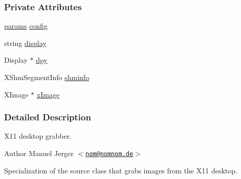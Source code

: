 \subsubsection*{\-Private \-Attributes}
\begin{DoxyCompactItemize}
\item 
\hyperlink{structX11Source_1_1params}{params} \hyperlink{classX11Source_a0bb66f8a67eaf9fd1a9c7cd457744e6a}{config}
\item 
string \hyperlink{classX11Source_aca767875225424e06a91240ce66878fd}{display}
\item 
\-Display $\ast$ \hyperlink{classX11Source_ab29ca4f07bd4d6e512d900268b9ae6e4}{dpy}
\item 
\-X\-Shm\-Segment\-Info \hyperlink{classX11Source_a77384d75a89d1fdd0cb3f20f61453f46}{shminfo}
\item 
\-X\-Image $\ast$ \hyperlink{classX11Source_a88bec28d12299ca93f4516a1e6ce7cff}{x\-Image}
\end{DoxyCompactItemize}


\subsubsection{\-Detailed \-Description}
\-X11 desktop grabber. 

\begin{DoxyAuthor}{\-Author}
\-Manuel \-Jerger $<$\href{mailto:nom@nomnom.de}{\tt nom@nomnom.\-de}$>$
\end{DoxyAuthor}
\-Specialization of the source class that grabs images from the \-X11 desktop. 

